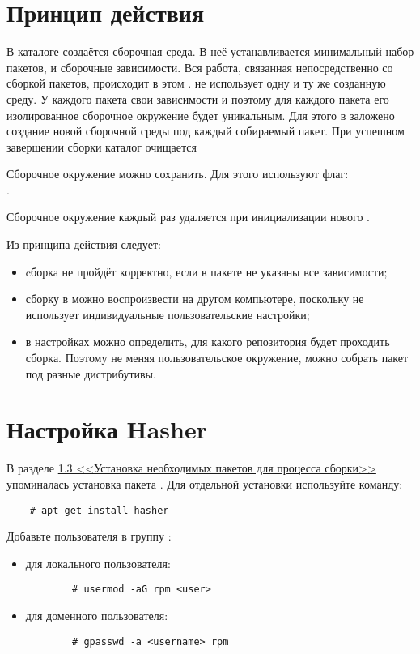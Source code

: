 \section{Принцип действия}
В каталоге  создаётся сборочная среда. В неё устанавливается минимальный набор 
пакетов,  и сборочные зависимости. Вся работа, связанная непосредственно со сборкой пакетов, 
происходит в этом .  не использует одну и ту же созданную среду. У каждого пакета 
свои зависимости и поэтому для каждого пакета его изолированное сборочное окружение будет уникальным. Для 
этого в  заложено создание новой сборочной среды под каждый собираемый пакет. При успешном 
завершении сборки каталог  очищается%

Сборочное окружение можно сохранить. Для этого используют флаг:\\ .

Сборочное окружение каждый раз удаляется при инициализации нового .

Из принципа действия  следует:
\begin{itemize}
	\item cборка не пройдёт корректно, если в пакете не указаны все зависимости;
	\item сборку в  можно воспроизвести на другом компьютере, поскольку  
		не использует индивидуальные пользовательские настройки;
	\item в настройках можно определить, для какого репозитория будет проходить сборка. Поэтому не 
		меняя пользовательское окружение, можно собрать пакет под разные дистрибутивы.
\end{itemize}


\hypertarget{5.3}{\section{Настройка Hasher}}
В разделе \hyperlink{1.3}{1.3 <<Установка необходимых пакетов для процесса сборки>>}  упоминалась 
установка пакета . Для отдельной установки используйте команду: 
\begin{verbatim}
	# apt-get install hasher
\end{verbatim}

Добавьте пользователя в группу :
\begin{itemize}
	\item для локального пользователя:
	\begin{verbatim}
		# usermod -aG rpm <user>
	\end{verbatim}
	
	\item для доменного пользователя: 
	\begin{verbatim}
		# gpasswd -a <username> rpm
	\end{verbatim}
\end{itemize} 

